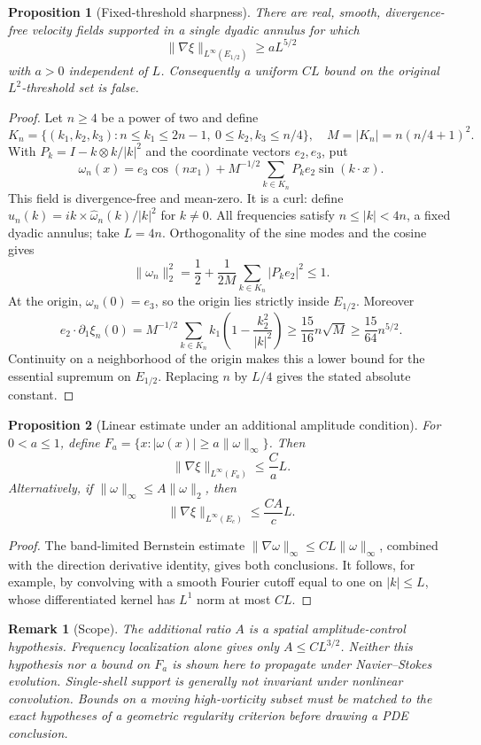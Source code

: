\documentclass[11pt]{article}
\newtheorem{proposition}{Proposition}
\newtheorem{remark}{Remark}
\begin{document}
\begin{proposition}[Fixed-threshold sharpness]
There are real, smooth, divergence-free velocity fields supported in a single dyadic annulus for which
\[
 \|\nabla\xi\|_{L^\infty(E_{1/2})}\ge a L^{5/2}
\]
with $a>0$ independent of $L$. Consequently a uniform $CL$ bound on the original $L^2$-threshold set is false.
\end{proposition}
\begin{proof}
Let $n\ge4$ be a power of two and define
\[
 K_n=\{(k_1,k_2,k_3):n\le k_1\le2n-1,\ 0\le k_2,k_3\le n/4\},
 \quad M=|K_n|=n(n/4+1)^2.
\]
With $P_k=I-k\otimes k/|k|^2$ and the coordinate vectors $e_2,e_3$, put
\[
 \omega_n(x)=e_3\cos(nx_1)+M^{-1/2}\sum_{k\in K_n}P_ke_2\sin(k\cdot x).
\]
This field is divergence-free and mean-zero. It is a curl: define
$\widehat u_n(k)=i k\times\widehat\omega_n(k)/|k|^2$ for $k\ne0$.
All frequencies satisfy $n\le|k|<4n$, a fixed dyadic annulus; take $L=4n$.
Orthogonality of the sine modes and the cosine gives
\[
 \|\omega_n\|_2^2=\frac12+\frac1{2M}\sum_{k\in K_n}|P_ke_2|^2\le1.
\]
At the origin, $\omega_n(0)=e_3$, so the origin lies strictly inside $E_{1/2}$. Moreover
\[
 e_2\cdot\partial_1\xi_n(0)
 =M^{-1/2}\sum_{k\in K_n}k_1\left(1-\frac{k_2^2}{|k|^2}\right)
 \ge\frac{15}{16}n\sqrt M
 \ge\frac{15}{64}n^{5/2}.
\]
Continuity on a neighborhood of the origin makes this a lower bound for the essential supremum on $E_{1/2}$. Replacing $n$ by $L/4$ gives the stated absolute constant.
\end{proof}

\begin{proposition}[Linear estimate under an additional amplitude condition]
For $0<a\le1$, define $F_a=\{x:|\omega(x)|\ge a\|\omega\|_\infty\}$. Then
\[
 \|\nabla\xi\|_{L^\infty(F_a)}\le\frac{C}{a}L.
\]
Alternatively, if $\|\omega\|_\infty\le A\|\omega\|_2$, then
\[
 \|\nabla\xi\|_{L^\infty(E_c)}\le\frac{CA}{c}L.
\]
\end{proposition}
\begin{proof}
The band-limited Bernstein estimate $\|\nabla\omega\|_\infty\le CL\|\omega\|_\infty$, combined with the direction derivative identity, gives both conclusions. It follows, for example, by convolving with a smooth Fourier cutoff equal to one on $|k|\le L$, whose differentiated kernel has $L^1$ norm at most $CL$.
\end{proof}

\begin{remark}[Scope]
The additional ratio $A$ is a spatial amplitude-control hypothesis. Frequency localization alone gives only $A\le CL^{3/2}$. Neither this hypothesis nor a bound on $F_a$ is shown here to propagate under Navier--Stokes evolution. Single-shell support is generally not invariant under nonlinear convolution. Bounds on a moving high-vorticity subset must be matched to the exact hypotheses of a geometric regularity criterion before drawing a PDE conclusion.
\end{remark}
\end{document}
